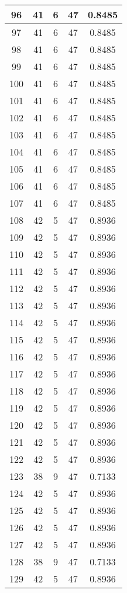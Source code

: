\documentclass[letterpaper, 12pt]{article}
\begin{document}
\begin{longtable}{|c|c|c|c|c|}
\hline
96 & 41 & 6 & 47 & 0.8485 \\
\hline
97 & 41 & 6 & 47 & 0.8485 \\
\hline
98 & 41 & 6 & 47 & 0.8485 \\
\hline
99 & 41 & 6 & 47 & 0.8485 \\
\hline
100 & 41 & 6 & 47 & 0.8485 \\
\hline
101 & 41 & 6 & 47 & 0.8485 \\
\hline
102 & 41 & 6 & 47 & 0.8485 \\
\hline
103 & 41 & 6 & 47 & 0.8485 \\
\hline
104 & 41 & 6 & 47 & 0.8485 \\
\hline
105 & 41 & 6 & 47 & 0.8485 \\
\hline
106 & 41 & 6 & 47 & 0.8485 \\
\hline
107 & 41 & 6 & 47 & 0.8485 \\
\hline
108 & 42 & 5 & 47 & 0.8936 \\
\hline
109 & 42 & 5 & 47 & 0.8936 \\
\hline
110 & 42 & 5 & 47 & 0.8936 \\
\hline
111 & 42 & 5 & 47 & 0.8936 \\
\hline
112 & 42 & 5 & 47 & 0.8936 \\
\hline
113 & 42 & 5 & 47 & 0.8936 \\
\hline
114 & 42 & 5 & 47 & 0.8936 \\
\hline
115 & 42 & 5 & 47 & 0.8936 \\
\hline
116 & 42 & 5 & 47 & 0.8936 \\
\hline
117 & 42 & 5 & 47 & 0.8936 \\
\hline
118 & 42 & 5 & 47 & 0.8936 \\
\hline
119 & 42 & 5 & 47 & 0.8936 \\
\hline
120 & 42 & 5 & 47 & 0.8936 \\
\hline
121 & 42 & 5 & 47 & 0.8936 \\
\hline
122 & 42 & 5 & 47 & 0.8936 \\
\hline
123 & 38 & 9 & 47 & 0.7133 \\
\hline
124 & 42 & 5 & 47 & 0.8936 \\
\hline
125 & 42 & 5 & 47 & 0.8936 \\
\hline
126 & 42 & 5 & 47 & 0.8936 \\
\hline
127 & 42 & 5 & 47 & 0.8936 \\
\hline
128 & 38 & 9 & 47 & 0.7133 \\
\hline
129 & 42 & 5 & 47 & 0.8936 \\

\end{longtable}
\end{document}
